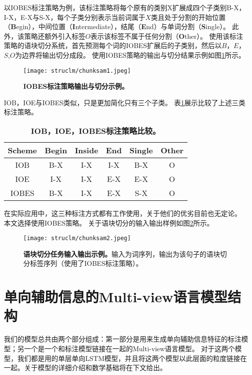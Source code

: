 以IOBES标注策略为例，该标注策略将每个原有的类别X扩展成四个子类别B-X，I-X，E-X与S-X，每个子类分别表示当前词属于$X$类且处于分割的开始位置（\textbf{B}egin），中间位置（\textbf{I}ntermediate），结尾（\textbf{E}nd）与单词分割（\textbf{S}ingle）。
此外，该策略还额外引入标签$O$表示该标签不属于任何分割（\textbf{O}ther）。
使用该标注策略的语块切分系统，首先预测每个词的IOBES扩展后的子类别，然后以$B$，$E$，$S$,$O$为边界将输出切分成段。
使用IOBES策略的输出与切分结果示例如图\ref{fig.tagschemesample}所示。
\begin{figure}[tbhp!]
\small
\centering
%
\texttt{[image: struclm/chunksam1.jpeg]}
\caption[IOBES标注策略输出与切分示例]{\textbf{IOBES标注策略输出与切分示例。}}\label{fig.tagschemesample}
\end{figure}

IOB，IOE与IOBES类似，只是更加简化只有三个子类。
表\ref{table.tagscheme}展示比较了上述三类标注策略。
\begin{table}
\centering
\begin{tabular}{|c|c|c|c|c|c|}
\hline
Scheme & Begin & Inside & End & Single & Other \\
\hline
IOB & B-X & I-X & I-X & B-X & O \\
\hline
IOE & I-X & I-X & E-X & E-X & O \\
\hline
IOBES & B-X & I-X & E-X & S-X & O \\
\hline
\end{tabular}
\caption[IOB，IOE，IOBES标注策略比较]{\textbf{IOB，IOE，IOBES标注策略比较。}}\label{table.tagscheme}
\end{table}
在实际应用中，这三种标注方式都有工作使用，关于他们的优劣目前也无定论。
本文选择使用IOBES策略。
关于语块切分的输入输出样例如图\ref{fig.chunksample}所示。
\begin{figure}[tbhp!]
\small
\centering
\texttt{[image: struclm/chunksam2.jpeg]}
%
\caption[语块切分任务输入输出示例]{\textbf{语块切分任务输入输出示例。}输入为词序列，输出为该句子的语块切分标签序列（使用了IOBES标注策略）。}\label{fig.chunksample}
\end{figure}



\section{单向辅助信息的Multi-view语言模型结构}
\label{Multi-view}
我们的模型总共由两个部分组成：第一部分是用来生成单向辅助信息特征的标注模型；另一个是一个和标注模型链接在一起的Multi-view语言模型。
对于这两个模型，我们都是用的单层单向LSTM模型，并且将这两个模型以此层面的粒度链接在一起。关于模型的详细介绍和数学基础将在下文给出。


